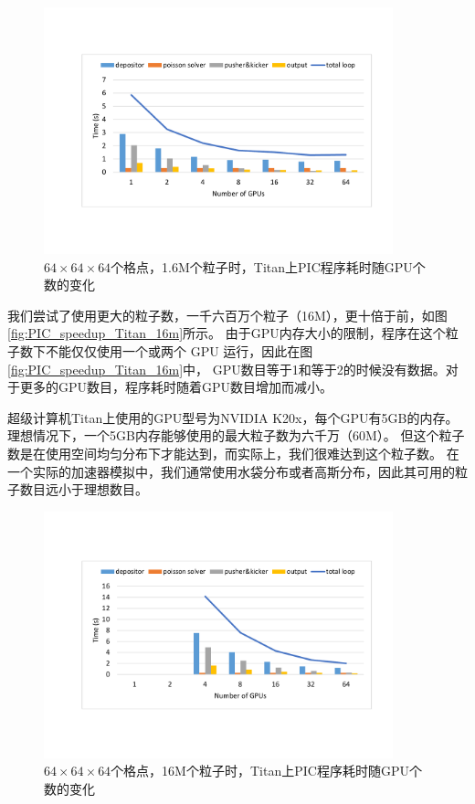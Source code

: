 \begin{figure}[!htb]
  \centering
  \includegraphics[width=0.9\textwidth]{Img/PIC_speedup_Titan_1_6m.pdf}
  \caption{$64 \times 64 \times 64$个格点，1.6M个粒子时，Titan上PIC程序耗时随GPU个数的变化}
  \label{fig:PIC_speedup_Titan_1_6m}
\end{figure}

我们尝试了使用更大的粒子数，一千六百万个粒子（16M），更十倍于前，如图\eqref{fig:PIC_speedup_Titan_16m}所示。
由于GPU内存大小的限制，程序在这个粒子数下不能仅仅使用一个或两个 GPU 运行，因此在图\eqref{fig:PIC_speedup_Titan_16m}中，
GPU数目等于1和等于2的时候没有数据。对于更多的GPU数目，程序耗时随着GPU数目增加而减小。

超级计算机Titan上使用的GPU型号为NVIDIA K20x，每个GPU有5GB的内存。
理想情况下，一个5GB内存能够使用的最大粒子数为六千万（60M）。
但这个粒子数是在使用空间均匀分布下才能达到，而实际上，我们很难达到这个粒子数。
在一个实际的加速器模拟中，我们通常使用水袋分布或者高斯分布，因此其可用的粒子数目远小于理想数目。

\begin{figure}[!htb]
  \centering
  \includegraphics[width=0.9\textwidth]{Img/PIC_speedup_Titan_16m.pdf}
  \caption{$64 \times 64 \times 64$个格点，16M个粒子时，Titan上PIC程序耗时随GPU个数的变化}
  \label{fig:PIC_speedup_Titan_16m}
\end{figure}

